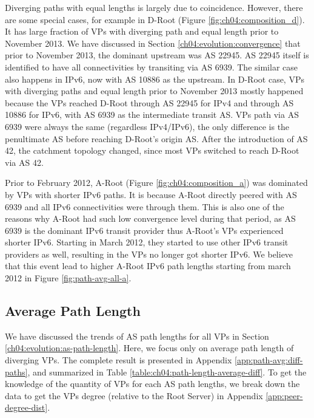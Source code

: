 Diverging paths with equal lengths is largely due to coincidence. However, there are some special cases, for example in D-Root (Figure \ref{fig:ch04:composition_d}). It has large fraction of VPs with diverging path and equal length prior to November 2013. We have discussed in Section \ref{ch04:evolution:convergence} that prior to November 2013, the dominant upstream was AS 22945. AS 22945 itself is identified to have all connectivities by transiting via AS 6939.
The similar case also happens in IPv6, now with AS 10886 as the upstream. In D-Root case, VPs with diverging paths and equal length prior to November 2013 mostly happened because the VPs reached D-Root through AS 22945 for IPv4 and through AS 10886 for IPv6, with AS 6939 as the intermediate transit AS. VPs path via AS 6939 were always the same (regardless IPv4/IPv6), the only difference is the penultimate AS before reaching D-Root's origin AS. After the introduction of AS 42, the catchment topology changed, since most VPs switched to reach D-Root via AS 42.

Prior to February 2012, A-Root (Figure \ref{fig:ch04:composition_a}) was dominated by VPs with shorter IPv6 paths. It is because A-Root directly peered with AS 6939 and all IPv6 connectivities were through them. This is also one of the reasons why A-Root had such low convergence level during that period, as AS 6939 is the dominant IPv6 transit provider thus A-Root's VPs experienced shorter IPv6. Starting in March 2012, they started to use other IPv6 transit providers as well, resulting in the VPs no longer got shorter IPv6. We believe that this event lead to higher A-Root IPv6 path lengths starting from march 2012 in Figure \ref{fig:path-avg-all-a}.

\subsection{Average Path Length}
\label{ch04:diff:avg-path-length}

We have discussed the trends of AS path lengths for all VPs in Section \ref{ch04:evolution:as-path-length}. Here, we focus only on average path length of diverging VPs. The complete result is presented in Appendix \ref{app:path-avg:diff-paths}, and summarized in Table \ref{table:ch04:path-length-average-diff}. To get the knowledge of the quantity of VPs for each AS path lengths, we break down the data to get the VPs degree (relative to the Root Server) in Appendix \ref{app:peer-degree-dist}. 

